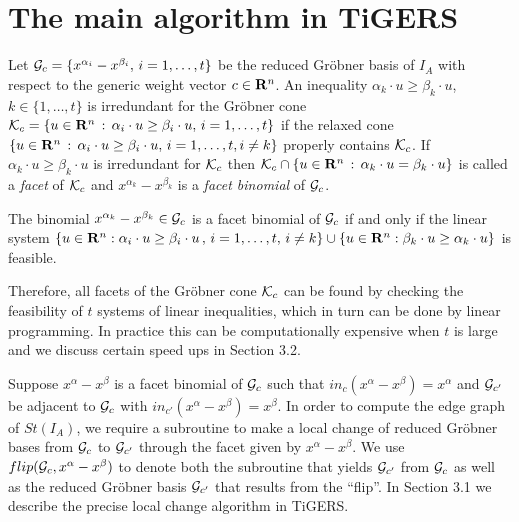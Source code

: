 \documentclass[11pt]{article}
\begin{document}

\section{The main algorithm in TiGERS}

Let ${\cal G}_c = \{ x^{\alpha_i} - x^{\beta_i}, \, i = 1,
\ldots, t \}$ be the reduced Gr\"obner basis of $I_A$ with respect to 
the generic weight vector $c \in {\bf R}^n$. 
An inequality $\alpha_k \cdot u \geq 
\beta_k \cdot u$, $k \in \{1,\ldots,t\}$ is irredundant for the 
Gr\"obner cone ${\cal K}_c = \{ u \in {\bf R}^n \, : \, \alpha_i \cdot
u \geq \beta_i \cdot u, \, i = 1, \ldots, t \}$ if the relaxed cone
$\{ u \in {\bf R}^n \, : \, \alpha_i \cdot u \geq \beta_i \cdot u, \,
i = 1, \ldots, t, i \neq k \}$ properly contains ${\cal K}_c$. If
$\alpha_k \cdot u \geq \beta_k \cdot u$ is irredundant for ${\cal
K}_c$ then ${\cal K}_c \cap \{u \in {\bf R}^n \, : \, \alpha_k \cdot u
= \beta_k \cdot u \}$ is called a {\em facet} of ${\cal K}_c$ and 
$x^{\alpha_k} - x^{\beta_k}$ is a {\em facet binomial} of ${\cal G}_c$.  

\begin{lemma}\cite{ST} \label{facets}
The binomial $x^{\alpha_k} - x^{\beta_k} \in {\cal
G}_c$ is a facet binomial of ${\cal G}_c$ if and only if 
the linear system $\{u \in {\bf R}^n : \alpha_i \cdot u \geq \beta_i
\cdot u \,, \, i = 1,\ldots,t,\, i \neq k \} \cup 
\{ u \in {\bf R}^n : \beta_k \cdot u \geq \alpha_k \cdot u \}$ is feasible.
\end{lemma}

Therefore, all facets of the Gr\"obner cone ${\cal K}_c$ can be found 
by checking the feasibility of  $t$ systems of linear inequalities,
which in turn can be done by linear programming. 
In practice this can be computationally expensive when $t$ is large
and we discuss certain speed ups in Section 3.2. 

Suppose $x^{\alpha} - x^{\beta}$ is a
facet binomial of ${\cal G}_c$ 
such that $in_c(x^{\alpha} - x^{\beta}) = x^{\alpha}$ and ${\cal G}_{c'}$
be adjacent to ${\cal G}_c$ with $in_{c'}(x^{\alpha} - x^{\beta})
= x^{\beta}$. In order to compute the edge graph of $St(I_A)$,
we require a subroutine to make a local change of reduced
Gr\"obner bases from ${\cal G}_c$ to ${\cal G}_{c'}$ through the facet
given by $x^{\alpha} - x^{\beta}$. We use ${flip({\cal G}_c, x^{\alpha} -
x^{\beta})}$ to denote both the subroutine that yields ${\cal G}_{c'}$ 
from ${\cal G}_c$ as well as the reduced Gr\"obner basis 
${\cal G}_{c'}$ that results from the ``flip''. In Section 3.1 we
describe the precise local change algorithm in TiGERS. 
\end{document}
